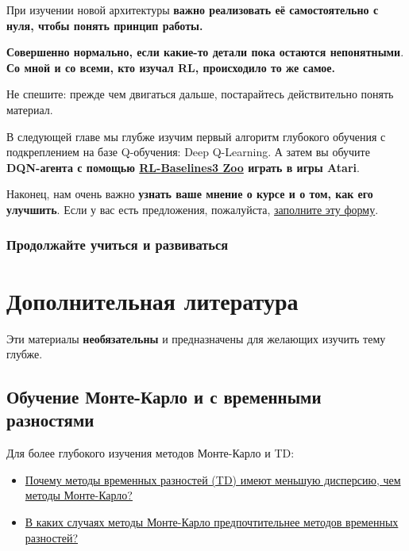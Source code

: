 \documentclass[11pt,a4paper]{article}
\begin{document}
При изучении новой архитектуры \textbf{важно реализовать её самостоятельно с нуля, чтобы понять принцип работы.}

\textbf{Совершенно нормально, если какие-то детали пока остаются непонятными}. \textbf{Со мной и со всеми, кто изучал RL, происходило то же самое.}

Не спешите: прежде чем двигаться дальше, постарайтесь действительно понять материал.

В следующей главе мы глубже изучим первый алгоритм глубокого обучения с подкреплением на базе Q-обучения: Deep Q-Learning. А затем вы обучите \textbf{DQN-агента с помощью \href{https://github.com/DLR-RM/rl-baselines3-zoo}{RL-Baselines3 Zoo} играть в игры Atari}.


Наконец, нам очень важно \textbf{узнать ваше мнение о курсе и о том, как его улучшить}. Если у вас есть предложения, пожалуйста, \href{https://forms.gle/BzKXWzLAGZESGNaE9}{заполните эту форму}.

\subsubsection{Продолжайте учиться и развиваться}\label{keep-learning-stay-awesome-1}

\section{Дополнительная литература}\label{additional-readings}

Эти материалы \textbf{необязательны} и предназначены для желающих изучить тему глубже.

\subsection{Обучение Монте-Карло и с временными разностями}\label{monte-carlo-and-td-learning}

Для более глубокого изучения методов Монте-Карло и TD:

\begin{itemize}
\tightlist
\item
  \href{https://stats.stackexchange.com/questions/355820/why-do-temporal-difference-td-methods-have-lower-variance-than-monte-carlo-met}{Почему методы временных разностей (TD) имеют меньшую дисперсию, чем методы Монте-Карло?}
\item
  \href{https://stats.stackexchange.com/questions/336974/when-are-monte-carlo-methods-preferred-over-temporal-difference-ones}{В каких случаях методы Монте-Карло предпочтительнее методов временных разностей?}
\end{itemize}
\end{document}
